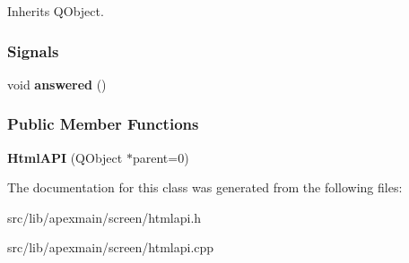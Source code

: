 \hypertarget{classapex_1_1_html_a_p_i}{
\label{classapex_1_1_html_a_p_i}
}


Inherits Q\-Object.

\subsubsection*{Signals}
\begin{DoxyCompactItemize}
\item
\hypertarget{classapex_1_1_html_a_p_i_adbe7d26e77358efbde56d8003b2d7669}{void {\bfseries answered} ()}\label{classapex_1_1_html_a_p_i_adbe7d26e77358efbde56d8003b2d7669}

\end{DoxyCompactItemize}
\subsubsection*{Public Member Functions}
\begin{DoxyCompactItemize}
\item
\hypertarget{classapex_1_1_html_a_p_i_a20443a8a6fb54c5ea65b5c62b1003613}{{\bfseries Html\-A\-P\-I} (Q\-Object $\ast$parent=0)}\label{classapex_1_1_html_a_p_i_a20443a8a6fb54c5ea65b5c62b1003613}

\end{DoxyCompactItemize}


The documentation for this class was generated from the following files\-:\begin{DoxyCompactItemize}
\item
src/lib/apexmain/screen/htmlapi.\-h\item
src/lib/apexmain/screen/htmlapi.\-cpp\end{DoxyCompactItemize}
